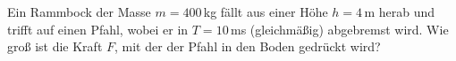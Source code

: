\begin{ExerciseBlock}
Ein Rammbock der Masse $m=400\,$kg fällt aus einer Höhe $h=4\,$m herab und trifft auf einen Pfahl, wobei er in $T=10\,$ms (gleichmäßig) abgebremst wird. Wie groß ist die Kraft $F$, mit der der Pfahl in den Boden gedrückt wird?
\end{ExerciseBlock}
